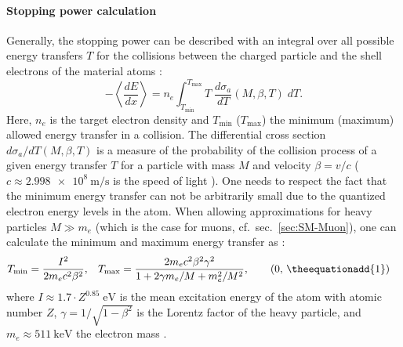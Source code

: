 \paragraph{Stopping power calculation}
Generally, the stopping power can be described with an integral over all possible energy transfers $T$ for the collisions between the charged particle and the shell electrons of the material atoms \cite{Book-KolanoskiWermes}:
\begin{equation}
    -\left\langle \frac{dE}{dx} \right\rangle = n_e\int_{T_\text{min}}^{T_\text{max}} T \; \frac{d\sigma_a}{dT}(M,\beta,T)\;dT.
    \label{eq:Interactions-Integral}
\end{equation}
Here, $n_e$ is the target electron density and $T_\text{min}$ ($T_\text{max}$) the minimum (maximum) allowed energy transfer in a collision. The differential cross section $d\sigma_a/dT(M,\beta,T)$ is a measure of the probability of the collision process of a given energy transfer $T$ for a particle with mass $M$ and velocity $\beta=v/c$ ($c\approx \SI{2.998e8}{\meter/\second}$ is the speed of light \cite{PDG2024}). One needs to respect the fact that the minimum energy transfer can not be arbitrarily small due to the quantized electron energy levels in the atom. When allowing approximations for heavy particles $M \gg m_e$ (which is the case for muons, cf.\ sec.\ \ref{sec:SM-Muon}), one can calculate the minimum and maximum energy transfer as \cite{Book-KolanoskiWermes,PDG2024}:
\begin{align}
    T_\text{min}&= \frac{I^2}{2m_e c^2\beta^2},
    &
    T_\text{max}&= \frac{2 m_e c^2\beta^2\gamma^2}{1+2\gamma m_e/M+m_e^2/M^2},
\tag{\theequation, \theequationadd{1}}
\end{align}
 \hspace{-0.7em}
where $I\approx 1.7 \cdot Z^{0.85} \;\si{\electronvolt}$ is the mean excitation energy of the atom with atomic number $Z$, $\gamma=1/\sqrt{1-\beta^2}$ is the Lorentz factor of the heavy particle, and $m_e\approx\SI{511}{\kilo\electronvolt}$ the electron mass \cite{PDG2024}.
